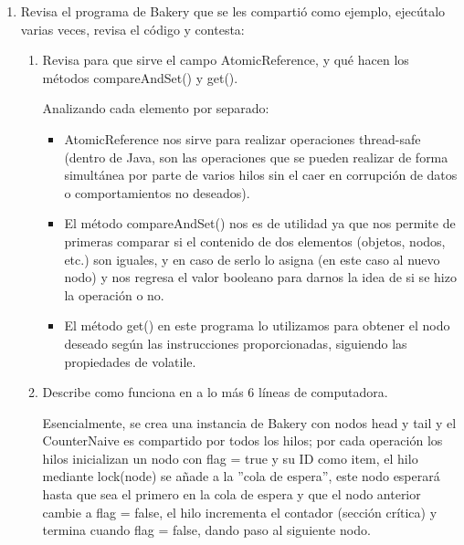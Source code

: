 \begin{enumerate}
    \hfill

    \item Revisa el programa de Bakery que se les compartió como ejemplo, ejecútalo varias veces, revisa el código y contesta:

    \begin{enumerate}
        \item Revisa para que sirve el campo AtomicReference, y qué hacen los métodos compareAndSet() y get().

        Analizando cada elemento por separado:

        \begin{itemize}
            \item AtomicReference nos sirve para realizar operaciones thread-safe (dentro de Java, son las operaciones que se pueden realizar de forma simultánea por parte de varios hilos sin el caer en corrupción de datos o comportamientos no deseados).

            \item El método compareAndSet() nos es de utilidad ya que nos permite de primeras comparar si el contenido de dos elementos (objetos, nodos, etc.) son iguales, y en caso de serlo lo asigna  (en este caso al nuevo nodo) y nos regresa el valor booleano para darnos la idea de si se hizo la operación o no. 

            \item El método get() en este programa lo utilizamos para obtener el nodo deseado según las instrucciones proporcionadas, siguiendo las propiedades de volatile.\\
            
        \end{itemize}

        

        \item Describe como funciona en a lo más 6 líneas de computadora.
        
        Esencialmente, se crea una instancia de Bakery con nodos head y tail y el CounterNaive es compartido por todos los hilos; por cada operación los hilos inicializan un nodo con flag = true y su ID como item, el hilo mediante lock(node) se añade a la ''cola de espera'', este nodo esperará hasta que sea el primero en la cola de espera y que el nodo anterior cambie a flag = false, el hilo incrementa el contador (sección crítica) y termina cuando flag = false, dando paso al siguiente nodo.\\


\end{enumerate}
\end{enumerate}
